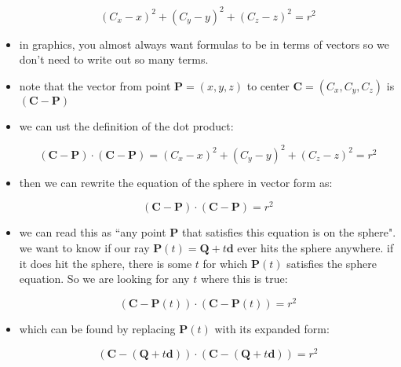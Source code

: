 \begin{itemize}
        \begin{equation}
            (C_{x} - x)^{2}+(C_{y} - y)^{2}+(C_{z} - z)^{2} = r^{2}
        \end{equation}

    \item in graphics, you almost always want formulas to be in terms of
        vectors so we don't need to write out so many terms.
    \item note that the vector from point $\mathbf{P}=(x,y,z)$ to center
        $\mathbf{C}=(C_{x},C_{y},C_{z})$ is $(\mathbf{C}-\mathbf{P})$
    \item we can ust the definition of the dot product:

        \begin{equation}
            (\mathbf{C}-\mathbf{P}) \cdot (\mathbf{C}-\mathbf{P}) = (C_{x} - x)^{2}+(C_{y} - y)^{2}+(C_{z} - z)^{2} = r^{2}
        \end{equation}

    \item then we can rewrite the equation of the sphere in vector form as:

        \begin{equation}
            (\mathbf{C}-\mathbf{P}) \cdot (\mathbf{C}-\mathbf{P}) = r^{2}
        \end{equation}

    \item we can read this as ``any point $\mathbf{P}$ that satisfies this
        equation is on the sphere". we want to know if our ray 
        $\mathbf{P}(t)=\mathbf{Q}+t\mathbf{d}$ ever hits the sphere anywhere. if
        it does hit the sphere, there is some $t$ for which $\mathbf{P}(t)$
        satisfies the sphere equation. So we are looking for any $t$ where this
        is true:

        \begin{equation}
            (\mathbf{C}-\mathbf{P}(t)) \cdot (\mathbf{C}-\mathbf{P}(t)) = r^{2}
        \end{equation}

    \item which can be found by replacing $\mathbf{P}(t)$ with its expanded
        form:

        \begin{equation}
            (\mathbf{C}-(\mathbf{Q}+t\mathbf{d})) \cdot
            (\mathbf{C}-(\mathbf{Q}+t\mathbf{d})) = r^{2}
        \end{equation}


\end{itemize}
